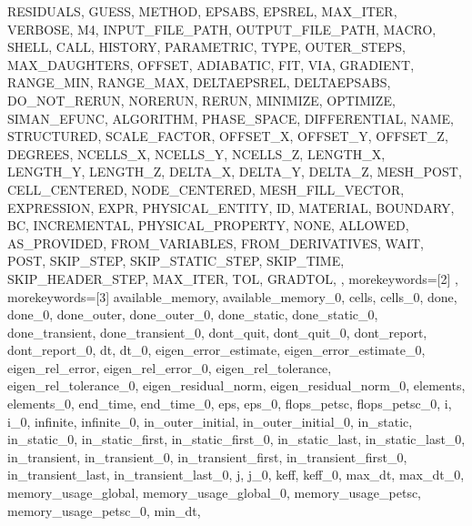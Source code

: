 {{      RESIDUALS,
      GUESS,
      METHOD,
      EPSABS,
      EPSREL,
      MAX_ITER,
      VERBOSE,
      M4,
      INPUT_FILE_PATH,
      OUTPUT_FILE_PATH,
      MACRO,
      SHELL,
      CALL,
      HISTORY,
      PARAMETRIC,
      TYPE,
      OUTER_STEPS,
      MAX_DAUGHTERS,
      OFFSET,
      ADIABATIC,
      FIT,
      VIA,
      GRADIENT,
      RANGE_MIN,
      RANGE_MAX,
      DELTAEPSREL,
      DELTAEPSABS,
      DO_NOT_RERUN,
      NORERUN,
      RERUN,
      MINIMIZE,
      OPTIMIZE,
      SIMAN_EFUNC,
      ALGORITHM,
      PHASE_SPACE,
      DIFFERENTIAL,
      NAME,
      STRUCTURED,
      SCALE_FACTOR,
      OFFSET_X,
      OFFSET_Y,
      OFFSET_Z,
      DEGREES,
      NCELLS_X,
      NCELLS_Y,
      NCELLS_Z,
      LENGTH_X,
      LENGTH_Y,
      LENGTH_Z,
      DELTA_X,
      DELTA_Y,
      DELTA_Z,
      MESH_POST,
      CELL_CENTERED,
      NODE_CENTERED,
      MESH_FILL_VECTOR,
      EXPRESSION,
      EXPR,
      PHYSICAL_ENTITY,
      ID,
      MATERIAL,
      BOUNDARY,
      BC,
      INCREMENTAL,
      PHYSICAL_PROPERTY,
      NONE,
      ALLOWED,
      AS_PROVIDED,
      FROM_VARIABLES,
      FROM_DERIVATIVES,
      WAIT,
      POST,
      SKIP_STEP,
      SKIP_STATIC_STEP,
      SKIP_TIME,
      SKIP_HEADER_STEP,
      MAX_ITER,
      TOL,
      GRADTOL,
},
morekeywords={[2]
},
morekeywords={[3]
      available_memory,
      available_memory_0,
      cells,
      cells_0,
      done,
      done_0,
      done_outer,
      done_outer_0,
      done_static,
      done_static_0,
      done_transient,
      done_transient_0,
      dont_quit,
      dont_quit_0,
      dont_report,
      dont_report_0,
      dt,
      dt_0,
      eigen_error_estimate,
      eigen_error_estimate_0,
      eigen_rel_error,
      eigen_rel_error_0,
      eigen_rel_tolerance,
      eigen_rel_tolerance_0,
      eigen_residual_norm,
      eigen_residual_norm_0,
      elements,
      elements_0,
      end_time,
      end_time_0,
      eps,
      eps_0,
      flops_petsc,
      flops_petsc_0,
      i,
      i_0,
      infinite,
      infinite_0,
      in_outer_initial,
      in_outer_initial_0,
      in_static,
      in_static_0,
      in_static_first,
      in_static_first_0,
      in_static_last,
      in_static_last_0,
      in_transient,
      in_transient_0,
      in_transient_first,
      in_transient_first_0,
      in_transient_last,
      in_transient_last_0,
      j,
      j_0,
      keff,
      keff_0,
      max_dt,
      max_dt_0,
      memory_usage_global,
      memory_usage_global_0,
      memory_usage_petsc,
      memory_usage_petsc_0,
      min_dt,
}}
